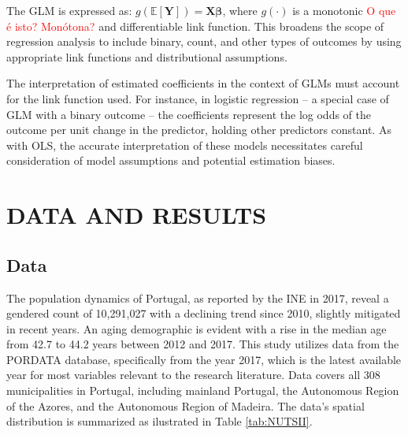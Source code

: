 \documentclass{aip-cp}
\begin{document}
The GLM is expressed as: $
    g(\mathbb{E}[\mathbf{Y}]) = \mathbf{X}\bm{\beta}
$,
where \(g(\cdot)\) is a monotonic  \textcolor{red}{O que é isto? Monótona?} and differentiable link function. This broadens the scope of regression analysis to include binary, count, and other types of outcomes by using appropriate link functions and distributional assumptions.

The interpretation of estimated coefficients in the context of GLMs must account for the link function used. For instance, in logistic regression -- a special case of GLM with a binary outcome -- the coefficients represent the log odds of the outcome per unit change in the predictor, holding other predictors constant. As with OLS, the accurate interpretation of these models necessitates careful consideration of model assumptions and potential estimation biases.


\section{\uppercase{Data and Results}}
\subsection{Data}
The population dynamics of Portugal, as reported by the INE in 2017, reveal a gendered count of 10,291,027 with a declining trend since 2010, slightly mitigated in recent years. An aging demographic is evident with a rise in the median age from 42.7 to 44.2 years between 2012 and 2017. 
%
This study utilizes data from the PORDATA database, specifically from the year 2017, which is the latest available year for most variables relevant to the research literature. Data covers all 308 municipalities in Portugal, including mainland Portugal, the Autonomous Region of the Azores, and the Autonomous Region of Madeira. The data's spatial distribution is summarized as ilustrated in Table \ref{tab:NUTSII}. %
\end{document}

